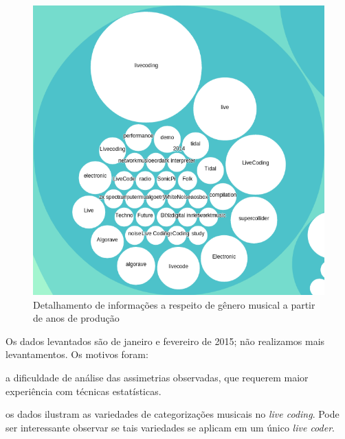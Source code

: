 \begin{figure}[h]
\begin{center}
\includegraphics[scale=0.6]{./imagens/zoomable_circle_packing_genre_year_livecoding2.png}
\caption{Detalhamento de informações a respeito de gênero musical a partir de anos de produção}
\label{fig:pacotao2}
\end{center}
\end{figure}

Os dados levantados são de janeiro e fevereiro de 2015; não realizamos mais levantamentos. Os motivos foram: \begin{inparaenum}
\item a dificuldade de análise das assimetrias observadas, que requerem maior experiência com técnicas estatísticas.
\item os dados ilustram as variedades de categorizações musicais no \emph{live coding}. Pode ser interessante observar se tais variedades se aplicam em um único \emph{live coder}.
\end{inparaenum}

